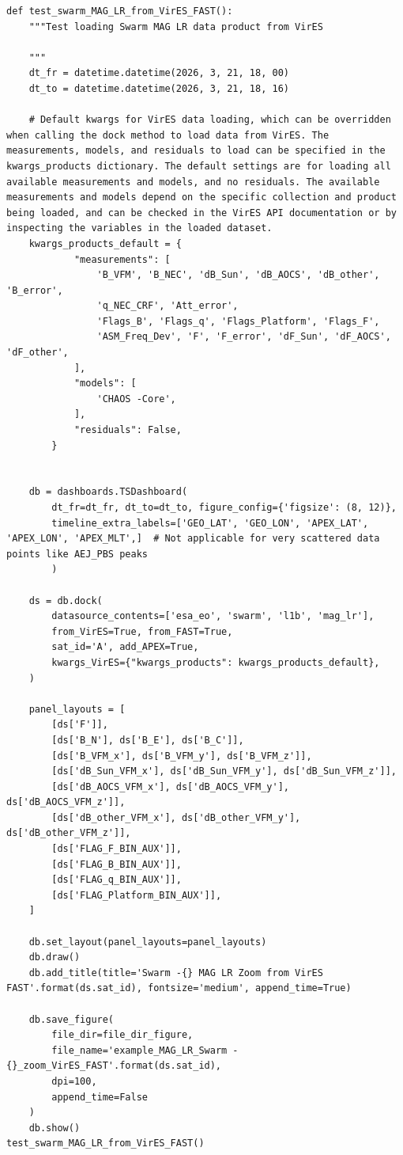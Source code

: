 \begin{verbatim}
def test_swarm_MAG_LR_from_VirES_FAST():
    """Test loading Swarm MAG LR data product from VirES

    """
    dt_fr = datetime.datetime(2026, 3, 21, 18, 00)
    dt_to = datetime.datetime(2026, 3, 21, 18, 16)

    # Default kwargs for VirES data loading, which can be overridden when calling the dock method to load data from VirES. The measurements, models, and residuals to load can be specified in the kwargs_products dictionary. The default settings are for loading all available measurements and models, and no residuals. The available measurements and models depend on the specific collection and product being loaded, and can be checked in the VirES API documentation or by inspecting the variables in the loaded dataset.
    kwargs_products_default = {
            "measurements": [
                'B_VFM', 'B_NEC', 'dB_Sun', 'dB_AOCS', 'dB_other', 'B_error',
                'q_NEC_CRF', 'Att_error',
                'Flags_B', 'Flags_q', 'Flags_Platform', 'Flags_F',
                'ASM_Freq_Dev', 'F', 'F_error', 'dF_Sun', 'dF_AOCS', 'dF_other',
            ],
            "models": [
                'CHAOS -Core',
            ],
            "residuals": False,
        }
    
    
    db = dashboards.TSDashboard(
        dt_fr=dt_fr, dt_to=dt_to, figure_config={'figsize': (8, 12)},
        timeline_extra_labels=['GEO_LAT', 'GEO_LON', 'APEX_LAT', 'APEX_LON', 'APEX_MLT',]  # Not applicable for very scattered data points like AEJ_PBS peaks
        )

    ds = db.dock(
        datasource_contents=['esa_eo', 'swarm', 'l1b', 'mag_lr'], 
        from_VirES=True, from_FAST=True,
        sat_id='A', add_APEX=True,
        kwargs_VirES={"kwargs_products": kwargs_products_default},
    )

    panel_layouts = [
        [ds['F']],
        [ds['B_N'], ds['B_E'], ds['B_C']],
        [ds['B_VFM_x'], ds['B_VFM_y'], ds['B_VFM_z']],
        [ds['dB_Sun_VFM_x'], ds['dB_Sun_VFM_y'], ds['dB_Sun_VFM_z']],
        [ds['dB_AOCS_VFM_x'], ds['dB_AOCS_VFM_y'], ds['dB_AOCS_VFM_z']],
        [ds['dB_other_VFM_x'], ds['dB_other_VFM_y'], ds['dB_other_VFM_z']],
        [ds['FLAG_F_BIN_AUX']],
        [ds['FLAG_B_BIN_AUX']],
        [ds['FLAG_q_BIN_AUX']],
        [ds['FLAG_Platform_BIN_AUX']],
    ]

    db.set_layout(panel_layouts=panel_layouts)
    db.draw()
    db.add_title(title='Swarm -{} MAG LR Zoom from VirES FAST'.format(ds.sat_id), fontsize='medium', append_time=True)
    
    db.save_figure(
        file_dir=file_dir_figure, 
        file_name='example_MAG_LR_Swarm -{}_zoom_VirES_FAST'.format(ds.sat_id), 
        dpi=100, 
        append_time=False
    )
    db.show()
test_swarm_MAG_LR_from_VirES_FAST()
\end{verbatim}

